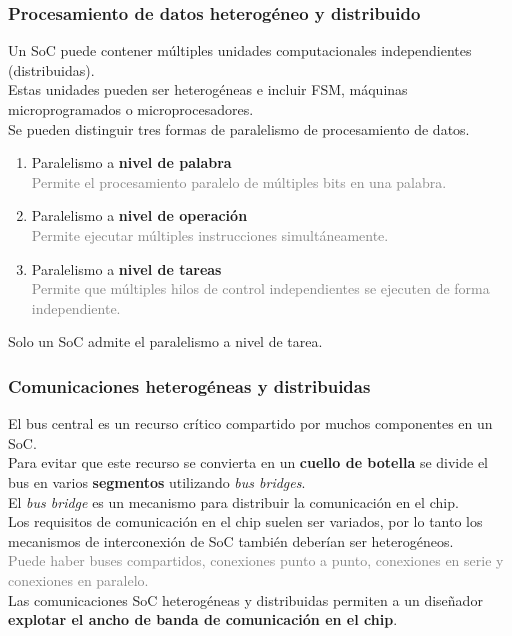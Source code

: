 \documentclass[aspectratio=169]{beamer}
\begin{document}
\begin{frame}[t,fragile]
    \frametitle{Procesamiento de datos heterogéneo y distribuido}
    Un SoC puede contener múltiples unidades computacionales independientes (distribuidas).\\
    \textcolor{verdeuca}{Estas unidades pueden ser heterogéneas e incluir FSM, máquinas microprogramados o microprocesadores.\\}
    \bigskip
    \pause
    Se pueden distinguir tres formas de paralelismo de procesamiento de datos.
    \begin{enumerate}
    \item Paralelismo a \textbf{nivel de palabra}\\
    \textcolor{gray}{Permite el procesamiento paralelo de múltiples bits en una palabra.}
    \item Paralelismo a \textbf{nivel de operación}\\
    \textcolor{gray}{Permite ejecutar múltiples instrucciones simultáneamente.}
    \item Paralelismo a \textbf{nivel de tareas}\\
    \textcolor{gray}{Permite que múltiples hilos de control independientes se ejecuten de forma independiente.}
    \end{enumerate}
    \bigskip
    Solo un SoC admite el paralelismo a nivel de tarea.
\end{frame}

\begin{frame}[t,fragile]
    \frametitle{Comunicaciones heterogéneas y distribuidas}
    El bus central es un recurso crítico compartido por muchos componentes en un SoC.\\
    \bigskip
    \pause
    Para evitar que este recurso se convierta en un \textbf{cuello de botella} se divide el bus en varios \textbf{segmentos} utilizando \emph{bus bridges}.\\
    \textcolor{verdeuca}{El \emph{bus bridge} es un mecanismo para distribuir la comunicación en el chip.\\}
    \bigskip
    \pause
    Los requisitos de comunicación en el chip suelen ser variados, por lo tanto los mecanismos de interconexión de SoC también deberían ser heterogéneos.\\
    \vspace{0.2cm}
    \textcolor{gray}{Puede haber buses compartidos, conexiones punto a punto, conexiones en serie y conexiones en paralelo.\\}
    \bigskip
    \pause
    Las comunicaciones SoC heterogéneas y distribuidas permiten a un diseñador \textbf{explotar el ancho de banda de comunicación en el chip}.\\
\end{frame}
\end{document}
